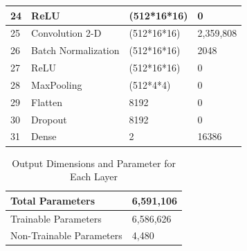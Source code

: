 \begin{table}
\begin{tabular}{|l|l|l|l|}
		24 & ReLU & (512*16*16) & 0 \\                       \hline
		25 & Convolution 2-D & (512*16*16) & 2,359,808 \\        \hline
		26 & Batch Normalization & (512*16*16) & 2048 \\     \hline
		27 & ReLU & (512*16*16) & 0 \\                       \hline
		28 & MaxPooling & (512*4*4) & 0 \\                   \hline
		29 & Flatten & 8192 & 0 \\                           \hline
		30 & Dropout & 8192 & 0 \\                           \hline
		31 & Dense & 2 & 16386 \\\hline
		\end{tabular}
	\end{table}

	\begin{table}[hbt!]
		\begin{tabularx}{1.03\textwidth}{|X|X|}
			\hline
			Total Parameters & 6,591,106 \\ \hline
			Trainable Parameters & 6,586,626 \\  \hline
			Non-Trainable Parameters & 4,480 \\ \hline
		\end{tabularx}
		\caption{Output Dimensions and Parameter for Each Layer}
	\end{table}
        
        
        
        
